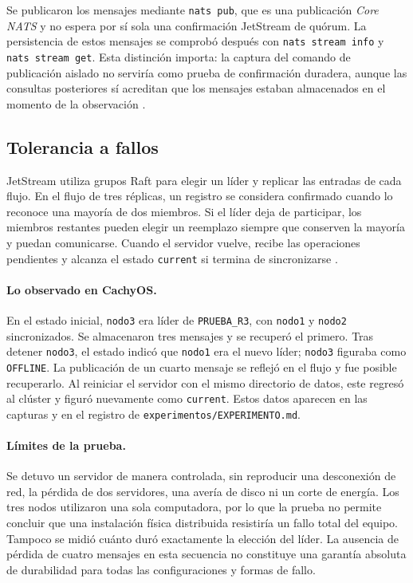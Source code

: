 \documentclass[12pt,a4paper]{article}
\begin{document}
Se publicaron los mensajes mediante \texttt{nats pub}, que es una publicación \emph{Core NATS} y no espera por sí sola una confirmación JetStream de quórum. La persistencia de estos mensajes se comprobó después con \texttt{nats stream info} y \texttt{nats stream get}. Esta distinción importa: la captura del comando de publicación aislado no serviría como prueba de confirmación duradera, aunque las consultas posteriores sí acreditan que los mensajes estaban almacenados en el momento de la observación \cite{natsreplication}.

\subsection{Tolerancia a fallos}
JetStream utiliza grupos Raft para elegir un líder y replicar las entradas de cada flujo. En el flujo de tres réplicas, un registro se considera confirmado cuando lo reconoce una mayoría de dos miembros. Si el líder deja de participar, los miembros restantes pueden elegir un reemplazo siempre que conserven la mayoría y puedan comunicarse. Cuando el servidor vuelve, recibe las operaciones pendientes y alcanza el estado \texttt{current} si termina de sincronizarse \cite{natsclustering,natsreplication}.

\paragraph{Lo observado en CachyOS.}
En el estado inicial, \texttt{nodo3} era líder de \texttt{PRUEBA\_R3}, con \texttt{nodo1} y \texttt{nodo2} sincronizados. Se almacenaron tres mensajes y se recuperó el primero. Tras detener \texttt{nodo3}, el estado indicó que \texttt{nodo1} era el nuevo líder; \texttt{nodo3} figuraba como \texttt{OFFLINE}. La publicación de un cuarto mensaje se reflejó en el flujo y fue posible recuperarlo. Al reiniciar el servidor con el mismo directorio de datos, este regresó al clúster y figuró nuevamente como \texttt{current}. Estos datos aparecen en las capturas y en el registro de \texttt{experimentos/EXPERIMENTO.md}.

\paragraph{Límites de la prueba.}
Se detuvo un servidor de manera controlada, sin reproducir una desconexión de red, la pérdida de dos servidores, una avería de disco ni un corte de energía. Los tres nodos utilizaron una sola computadora, por lo que la prueba no permite concluir que una instalación física distribuida resistiría un fallo total del equipo. Tampoco se midió cuánto duró exactamente la elección del líder. La ausencia de pérdida de cuatro mensajes en esta secuencia no constituye una garantía absoluta de durabilidad para todas las configuraciones y formas de fallo.
\end{document}
